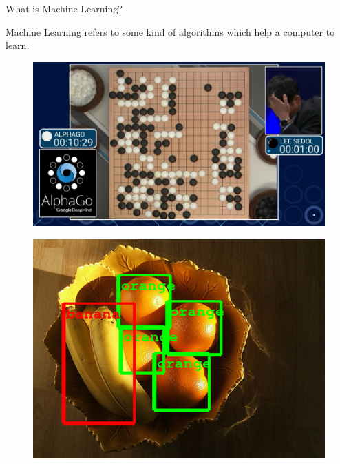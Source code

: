 \documentclass[mathserif]{beamer}
\begin{document}
\begin{frame}{What is Machine Learning?}
\begin{multicols}{2}
\small Machine Learning refers to some kind of algorithms which help  a computer to learn.

\begin{figure}[H]
\centering
\includegraphics[scale=0.15]{figures/alphaGO.jpeg}
\end{figure}

\columnbreak

\begin{figure}[H]
\centering
\includegraphics[scale=0.2]{figures/rimages.jpg}
\end{figure}

\end{multicols}
\end{frame}
\end{document}
